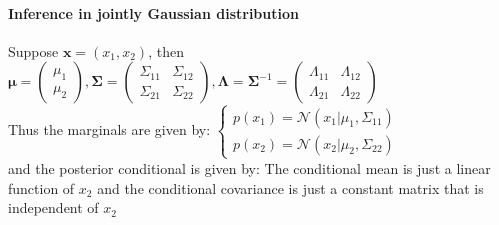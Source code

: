 \paragraph{Inference in jointly Gaussian distribution}
Suppose $\bm{x} = (x_{1}, x_{2})$, then\\
$\bm{\mu} = \begin{pmatrix}
    \mu_{1}\\
    \mu_{2}
\end{pmatrix},
\bm{\Sigma} = \begin{pmatrix}
    \Sigma_{11} & \Sigma_{12}\\
    \Sigma_{21} & \Sigma_{22}
\end{pmatrix},
\bm{\Lambda} = \bm{\Sigma}^{-1} = \begin{pmatrix}
    \Lambda_{11} & \Lambda_{12}\\
    \Lambda_{21} & \Lambda_{22}
\end{pmatrix} $\\
Thus the marginals are given by: 
$\begin{cases}
    p(x_{1}) = \mathcal{N}(x_{1}|\mu_{1}, \Sigma_{11})\\
    p(x_{2}) = \mathcal{N}(x_{2}|\mu_{2}, \Sigma_{22})
\end{cases}$\\
and the posterior conditional is given by: 
The conditional mean is just a linear function of $x_{2}$ and the conditional covariance 
is just a constant matrix that is independent of $x_{2}$






